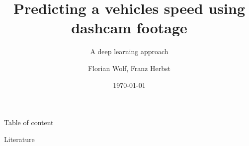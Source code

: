 \documentclass[handout, 10pt, aspectratio=43]{beamer}
\title{Predicting a vehicles speed using dashcam footage} %
\subtitle{A deep learning approach}
\author{Florian Wolf, Franz Herbst}
\institute[Universität Konstanz]{
    Machine Learning using Matlab \\
    Universität Konstanz
} %
\date{\today}
\begin{document}
    \RaggedRight
    \frame{\titlepage}
    
    \begin{frame}{Table of content}
        \tableofcontents
    \end{frame}
    
    
%    
%    
%    

    \begin{frame}[allowframebreaks]{Literature}
    	\nocite{*}
        \printbibliography
     \end{frame}
\end{document}
